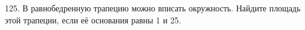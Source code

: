 125. В равнобедренную трапецию можно вписать окружность. Найдите площадь этой трапеции, если её основания равны 1 и 25.\\
